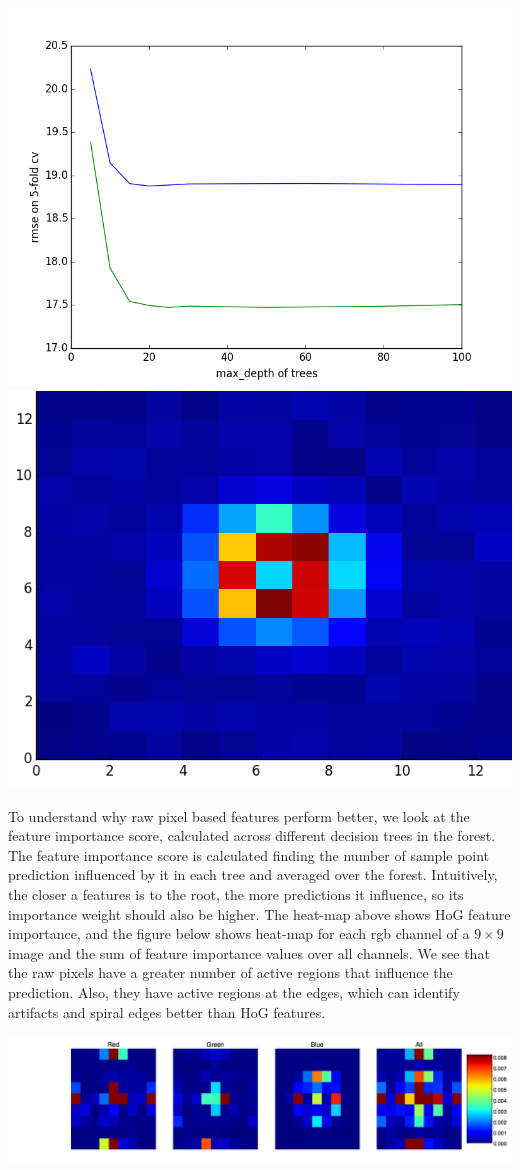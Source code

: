 \documentclass[landscape,a0paper,fontscale=0.292]{baposter}
\begin{document}
\begin{poster}
{    \begin{center}
	\includegraphics[width=0.4\linewidth]{HoGVsRawFeats.png}   
	\includegraphics[width=0.35\linewidth]{HoGHeatMap.png}  
    \end{center}
	
	To understand why raw pixel based features perform better, we look at the feature importance score, calculated across different decision trees in the forest. The feature importance score is calculated finding the number of sample point prediction influenced by it in each tree and averaged over the forest. Intuitively, the closer a features is to the root, the more predictions it influence, so its importance weight should also be higher. The heat-map above shows HoG feature importance, and the figure below shows heat-map for each rgb channel of a $9 \times 9$ image and the sum of feature importance values over all channels. We see that the raw pixels have a greater number of active regions that influence the prediction. Also, they have active regions at the edges, which can identify artifacts and spiral edges better than HoG features.
	
	 \begin{center}
	 \includegraphics[width=0.8\linewidth]{heat_map_raw_rgba.jpg}  
	 \end{center}  
   
   }


\end{poster}
\end{document}
